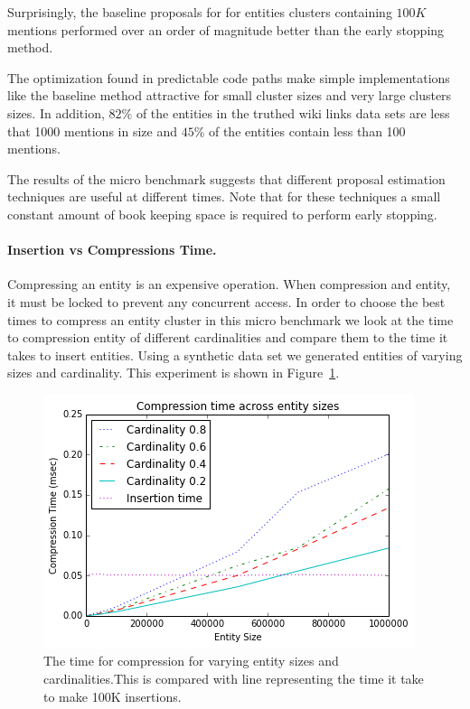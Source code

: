 Surprisingly, the baseline proposals for for entities clusters containing $100 K$ mentions
performed over an order of magnitude better than the early stopping method.

The optimization found in predictable code paths make simple implementations
like the baseline method attractive for small cluster sizes and very large clusters sizes.
In addition, $82\%$ of the entities in the truthed wiki links data sets are less
that 1000 mentions in size and $45\%$ of the entities contain less than 100
mentions.

The results of the micro benchmark suggests that different proposal estimation
techniques are useful at different times.
Note that for these techniques a small constant amount of book keeping space is required to perform early stopping.


\paragraph{Insertion vs Compressions Time.}
Compressing an entity is an expensive operation.
When compression and entity, it must be locked to prevent any concurrent access.
In order to choose the best times to compress an entity cluster in this 
micro benchmark we look at the time to compression entity of different cardinalities
and compare them to the time it takes to insert entities. 
Using a synthetic data set we generated entities of varying sizes and cardinality.
This experiment is shown in Figure~\ref{fig:compression-v-insertion}. 


\begin{figure}
\centering
\includegraphics[width=\columnwidth]{media/compression-entitysize.png}
\caption{The time for compression for varying entity sizes and cardinalities.This is compared with line representing the time it take to make 100K insertions. }
\label{fig:compression-v-insertion}
\end{figure}

